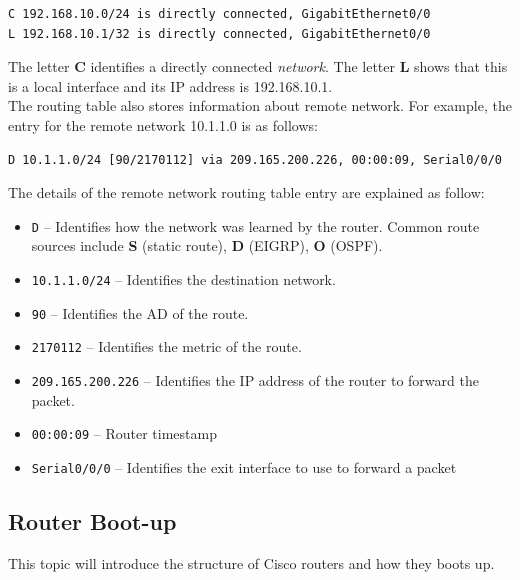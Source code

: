 \begin{verbatim}
C 192.168.10.0/24 is directly connected, GigabitEthernet0/0
L 192.168.10.1/32 is directly connected, GigabitEthernet0/0
\end{verbatim}

The letter \textbf{C} identifies a directly connected \emph{network}. The letter \textbf{L} shows that this is a local interface and its IP address is 192.168.10.1.\\

The routing table also stores information about remote network. For example, the entry for the remote network 10.1.1.0 is as follows:

\begin{verbatim}
D 10.1.1.0/24 [90/2170112] via 209.165.200.226, 00:00:09, Serial0/0/0
\end{verbatim}

The details of the remote network routing table entry are explained as follow:

\begin{itemize}
\item \verb|D| -- Identifies how the network was learned by the router. Common  route sources include \textbf{S} (static route), \textbf{D} (EIGRP), \textbf{O} (OSPF).

\item \verb|10.1.1.0/24| -- Identifies the destination network.

\item \verb|90| -- Identifies the AD of the route.

\item \verb|2170112| -- Identifies the metric of the route.

\item \verb|209.165.200.226| -- Identifies the IP address of the router to forward the packet.

\item \verb|00:00:09| -- Router timestamp

\item \verb|Serial0/0/0| -- Identifies the exit interface to use to forward a packet
\end{itemize}

\subsection{Router Boot-up}

This topic will introduce the structure of Cisco routers and how they boots up.\\

